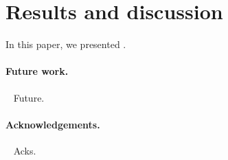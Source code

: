\documentclass[runningheads,a4paper]{llncs}
\begin{document}
\section{Results and discussion}\label{sec:Results}

In this paper, we presented .

\paragraph*{Future work.}~
%
Future.

\paragraph*{Acknowledgements.}~
%
Acks.


%


\end{document}

